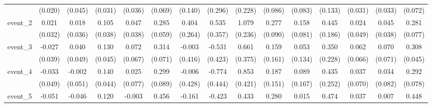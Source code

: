 {\begin{tabular}{l*{14}{c}}
            &     (0.020)         &     (0.045)         &     (0.031)         &     (0.036)         &     (0.069)         &     (0.140)         &     (0.296)         &     (0.228)         &     (0.086)         &     (0.083)         &     (0.133)         &     (0.031)         &     (0.033)         &     (0.072)         \\
[1em]
event\_2     &       0.021         &       0.018         &       0.105\sym{**} &       0.047         &       0.285\sym{***}&       0.404         &       0.535         &       1.079\sym{***}&       0.277\sym{**} &       0.158         &       0.445\sym{*}  &       0.024         &       0.045         &       0.281\sym{***}\\
            &     (0.032)         &     (0.036)         &     (0.038)         &     (0.038)         &     (0.059)         &     (0.264)         &     (0.357)         &     (0.236)         &     (0.090)         &     (0.081)         &     (0.186)         &     (0.049)         &     (0.038)         &     (0.077)         \\
[1em]
event\_3     &      -0.027         &       0.040         &       0.130\sym{**} &       0.072         &       0.314\sym{***}&      -0.003         &      -0.531         &       0.661         &       0.159         &       0.053         &       0.350         &       0.062         &       0.070         &       0.308\sym{***}\\
            &     (0.039)         &     (0.049)         &     (0.045)         &     (0.067)         &     (0.071)         &     (0.416)         &     (0.423)         &     (0.375)         &     (0.161)         &     (0.134)         &     (0.228)         &     (0.066)         &     (0.071)         &     (0.045)         \\
[1em]
event\_4     &      -0.033         &      -0.002         &       0.140\sym{**} &       0.025         &       0.299\sym{***}&      -0.006         &      -0.774         &       0.853\sym{*}  &       0.187         &       0.089         &       0.435         &       0.037         &       0.034         &       0.292\sym{***}\\
            &     (0.049)         &     (0.051)         &     (0.044)         &     (0.077)         &     (0.089)         &     (0.428)         &     (0.444)         &     (0.421)         &     (0.151)         &     (0.167)         &     (0.252)         &     (0.070)         &     (0.082)         &     (0.078)         \\
[1em]
event\_5     &      -0.051         &      -0.046         &       0.120\sym{**} &      -0.003         &       0.456\sym{***}&      -0.161         &      -0.423         &       0.433         &       0.280         &       0.015         &       0.474         &       0.037         &       0.007         &       0.448\sym{***}\\

\end{tabular}}
